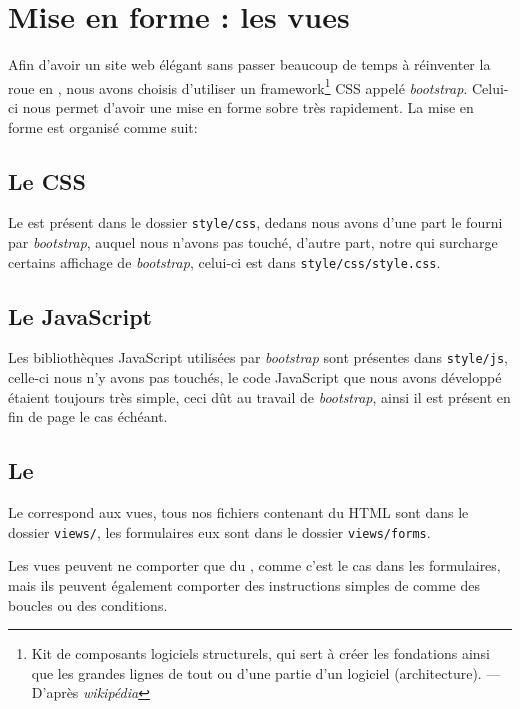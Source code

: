 \documentclass[12pt,a4paper,openany]{book}
\newcommand{\bootstrap}{\textit{bootstrap}}
\begin{document}
		\section{Mise en forme : les vues}
			Afin d'avoir un site web élégant sans passer beaucoup de temps à réinventer la roue en , nous avons choisis d'utiliser un
			framework\footnote{Kit de composants logiciels structurels, qui sert à créer les fondations ainsi que les grandes lignes de tout ou d’une partie d'un
			logiciel (architecture). --- D'après \textit{wikipédia}} CSS
			appelé \bootstrap{}. Celui-ci nous permet d'avoir une mise en forme sobre très rapidement.  La mise en forme est organisé comme suit:

			\subsection{Le CSS} Le  est présent dans le dossier \texttt{style/css}, dedans nous avons d'une part le  fourni par \bootstrap{}, auquel nous
			n'avons pas touché, d'autre part, notre  qui surcharge certains affichage de \bootstrap{}, celui-ci est dans \texttt{style/css/style.css}.
			
				
			\subsection{Le JavaScript}
			Les bibliothèques JavaScript utilisées par \textit{\bootstrap{}} sont présentes dans \texttt{style/js}, celle-ci nous n'y avons
					pas touchés, le code JavaScript que nous avons développé étaient toujours très simple, ceci dût au travail de \bootstrap{}, ainsi il est présent
					en fin de page  le cas échéant.
			
		\subsection{Le }
		Le  correspond aux vues, tous nos fichiers contenant du HTML sont dans le dossier \texttt{views/}, les formulaires 
		eux sont dans le dossier \texttt{views/forms}.
		
		Les vues peuvent ne comporter que du , comme c'est le cas dans les formulaires, mais ils peuvent également comporter des instructions simples
		de  comme des boucles ou des conditions.
\end{document}

